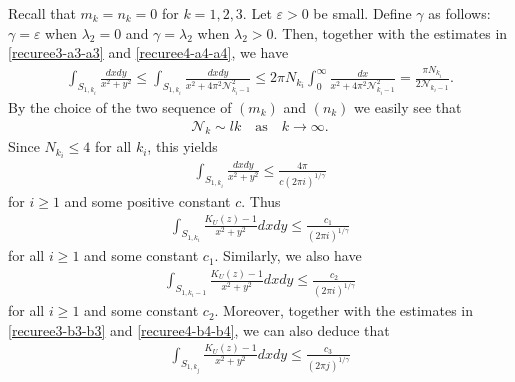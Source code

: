 \documentclass[12pt]{amsart}
\numberwithin{equation}{section}
\begin{document}
Recall that $m_k=n_k=0$ for $k=1,2,3$. Let $\varepsilon>0$ be small. Define $\gamma$ as follows: $\gamma=\varepsilon$ when $\lambda_2=0$ and $\gamma=\lambda_2$ when $\lambda_2>0$. Then, together with the estimates in \eqref{recuree3-a3-a3} and \eqref{recuree4-a4-a4}, we have
\begin{equation*}%
\begin{split}
\int_{S_{1,k_i}}\frac{dxdy}{x^2+y^2}\leq \int_{S_{1,k_i}}\frac{dxdy}{x^2+4\pi^2\mathcal{N}_{k_i-1}^2}\leq 2\pi N_{k_i}\int_0^\infty\frac{dx}{x^2+4\pi^2\mathcal{N}_{k_i-1}^2}=\frac{\pi N_{k_i}}{2\mathcal{N}_{k_i-1}}.
\end{split}
\end{equation*}
By the choice of the two sequence of $(m_k)$ and $(n_k)$ we easily see that
\begin{equation}\label{recuree1pm79-0qjw-1}
\begin{split}
\mathcal{N}_k \sim lk \quad \text{as} \quad k\to\infty.
\end{split}
\end{equation}
Since $N_{k_i}\leq 4$ for all $k_i$, this yields
\begin{equation*}%
\begin{split}
\int_{S_{1,k_i}}\frac{dxdy}{x^2+y^2}\leq \frac{4\pi}{c(2\pi i)^{1/\gamma}}
\end{split}
\end{equation*}
for $i\geq 1$ and some positive constant $c$. Thus
\begin{equation}\label{recuree1pm81}
\begin{split}
\int_{S_{1,k_i}}\frac{K_U(z)-1}{x^2+y^2}dxdy \leq \frac{c_1}{(2\pi i)^{1/\gamma}}
\end{split}
\end{equation}
for all $i\geq 1$ and some constant $c_1$. Similarly, we also have
\begin{equation}\label{recuree1pm81 fuzu-1}
\begin{split}
\int_{S_{1,k_i-1}}\frac{K_U(z)-1}{x^2+y^2}dxdy\leq \frac{c_2}{(2\pi i)^{1/\gamma}}
\end{split}
\end{equation}
for all $i\geq 1$ and some constant $c_2$. Moreover, together with the estimates in \eqref{recuree3-b3-b3} and \eqref{recuree4-b4-b4}, we can also deduce that
\begin{equation}\label{recuree1pm81-w}
\begin{split}
\int_{S_{1,k_j}}\frac{K_U(z)-1}{x^2+y^2}dxdy \leq \frac{c_3}{(2\pi j)^{1/\gamma}}
\end{split}
\end{equation}
\end{document}

